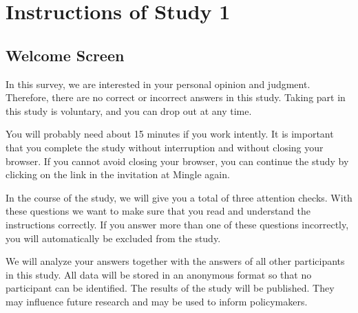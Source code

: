 \documentclass[egregdoesnotlikesansseriftitles]{scrartcl}
\begin{document}
\clearpage




\clearpage
\appendix


\section{Instructions of Study 1}\label{sec:app_study_1_instructions}
\subsection*{Welcome Screen}
In this survey, we are interested in your personal opinion and judgment. %
Therefore, there are no correct or incorrect answers in this study. %
Taking part in this study is voluntary, and you can drop out at any time. %

You will probably need about 15 minutes if you work intently. %
It is important that you complete the study without interruption and without closing your browser. %
If you cannot avoid closing your browser, you can continue the study by clicking on the link in the invitation at Mingle again. %

In the course of the study, we will give you a total of three attention checks. %
With these questions we want to make sure that you read and understand the instructions correctly. %
If you answer more than one of these questions incorrectly, you will automatically be excluded from the study. %

We will analyze your answers together with the answers of all other participants in this study. %
All data will be stored in an anonymous format so that no participant can be identified. %
The results of the study will be published. %
They may influence future research and may be used to inform policymakers. %
\end{document}
